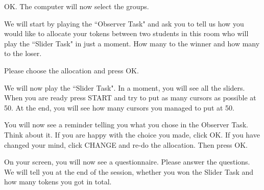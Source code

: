 \documentclass[11pt]{article}
\begin{document}
{\noindent OK. The computer will now select the groups. \par \medskip

\noindent We will start by playing the ``Observer Task" and ask you to tell us how you would like to allocate your tokens between two students in this room who will play the ``Slider Task" in just a moment. How many to the winner and how many to the loser. \par \medskip

 \par \medskip

\noindent Please choose the allocation and press OK. \par \medskip

 \par \medskip

\noindent We will now play the ``Slider Task". In a moment, you will see all the sliders. When you are ready press START and try to put as many cursors as possible at 50. At the end, you will see how many cursors you managed to put at 50.  \par \medskip

 \par \medskip

\noindent You will now see a reminder telling you what you chose in the Observer Task. Think about it. If you are happy with the choice you made, click OK. If you have changed your mind, click CHANGE and re-do the allocation. Then press OK. \par \medskip

 \par \medskip

\noindent On your screen, you will now see a questionnaire. Please answer the questions. We will tell you at the end of the session, whether you won the Slider Task and how many tokens you got in total. \par \medskip





}
\end{document}
